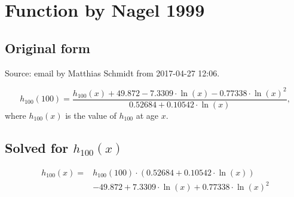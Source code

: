 
\section{Function by Nagel 1999}

\subsection{Original form}
Source: email by Matthias Schmidt from 2017-04-27 12:06.

\begin{equation}
  \label{eq:nagel.1999}
  h_{100}(100) = \frac{h_{100}(x) + 49.872 - 7.3309 \cdot \ln(x) - 0.77338 \cdot \ln(x)^2 }{0.52684 + 0.10542 \cdot \ln(x)} , 
\end{equation}
where $h_{100}(x)$ is the value of $h_{100}$ at age $x$.

\subsection{Solved for $h_{100}(x)$}

\begin{equation}
\begin{split}
  \label{eq:nagel.1999.solved.h100}
  h_{100}(x) = &h_{100}(100) \cdot (0.52684 + 0.10542 \cdot \ln(x)) \\
  &- 49.872 + 7.3309 \cdot \ln(x) + 0.77338 \cdot \ln(x)^2
\end{split}
\end{equation}

